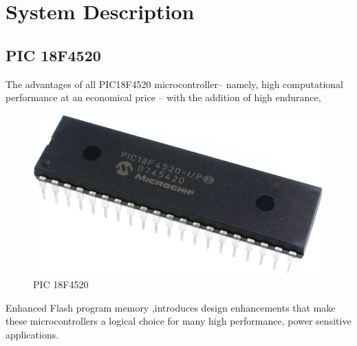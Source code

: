 \documentclass[12pt,a4paper,oneside,openright]{report}
\begin{document}
\section{System Description}
\subsection{PIC 18F4520}
The advantages of all PIC18F4520 microcontroller– namely, high computational performance at an economical price – with the addition of high endurance, 
\begin{figure}[h]
 \centering
 \includegraphics[width = .31\textwidth]{Figures/fig_4.png}
 \caption{PIC 18F4520}
 \label{uc}
\end{figure}
Enhanced Flash program memory ,introduces design enhancements that make these microcontrollers a logical choice for many high performance, power sensitive applications.
\end{document}
